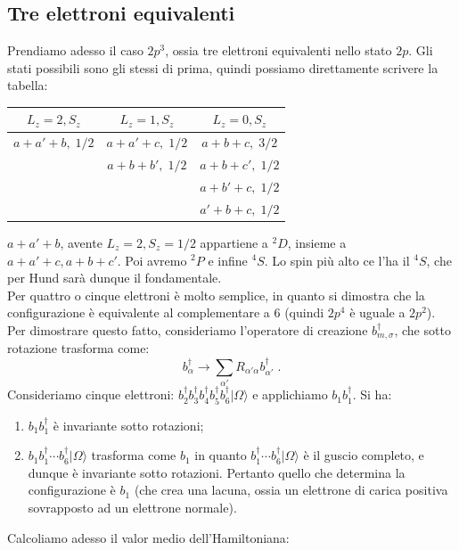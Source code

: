 \documentclass[10pt,a4paper]{report}
\theoremstyle{definition}
\numberwithin{equation}{section}
\newcommand{\ket}{\rangle}
\newcommand{\adj}[1]{#1^{\dagger}}
\begin{document}
\subsection{Tre elettroni equivalenti}
Prendiamo adesso il caso $2p^3$, ossia tre elettroni equivalenti nello stato $2p$. Gli stati possibili sono gli stessi di prima, quindi possiamo direttamente scrivere la tabella:

\begin{table}[h]
\centering
\begin{tabular}{c|c|c}
\toprule
\multicolumn{1}{c|}{$L_z=2, S_z$} &
\multicolumn{1}{c|}{$L_z=1, S_z$} &
\multicolumn{1}{c}{$L_z=0, S_z$} \\
\midrule
$a+a'+b,\; 1/2$ & $a+a'+c,\; 1/2$ & $a+b+c,\; 3/2$ \\
{} & $a+b+b',\; 1/2$ & $a+b+c',\; 1/2$ \\
{} & {} & $a+b'+c,\; 1/2$ \\
{} & {} & $a'+b+c,\; 1/2$ \\
\bottomrule
\end{tabular}
\end{table}
$a+a'+b$, avente $L_z=2, S_z=1/2$ appartiene a ${}^2D$, insieme a $a+a'+c,a+b+c'$. Poi avremo ${}^2P$ e infine ${}^4S$. Lo spin più alto ce l'ha il ${}^4S$, che per Hund sarà dunque il fondamentale. \\
Per quattro o cinque elettroni è molto semplice, in quanto si dimostra che la configurazione è equivalente al complementare a 6 (quindi $2p^4$ è uguale a $2p^2$). Per dimostrare questo fatto, consideriamo l'operatore di creazione $\adj{b_{m,\sigma}}$, che sotto rotazione trasforma come:
\begin{equation}
\adj{b_{\alpha}} \longrightarrow \sum_{\alpha'} R_{\alpha'\alpha}\adj{b_{\alpha'}}\;.
\end{equation}
Consideriamo cinque elettroni: $\adj{b_2}\adj{b_3}\adj{b_4}\adj{b_5}\adj{b_6}|\Omega\ket$ e applichiamo $b_1\adj{b_1}$. Si ha:
\begin{enumerate}
\item $b_1\adj{b_1}$ è invariante sotto rotazioni;
\item $b_1\adj{b_1}\cdots\adj{b_6}|\Omega\ket$ trasforma come $b_1$ in quanto $\adj{b_1}\cdots\adj{b_6}|\Omega\ket$ è il guscio completo, e dunque è invariante sotto rotazioni. Pertanto quello che determina la configurazione è $b_1$ (che crea una lacuna, ossia un elettrone di carica positiva sovrapposto ad un elettrone normale).
\end{enumerate}
Calcoliamo adesso il valor medio dell'Hamiltoniana:
\end{document}
